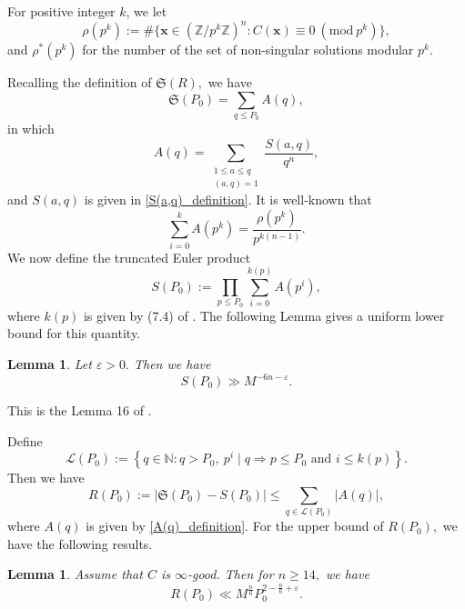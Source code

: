 \documentclass[12pt]{amsart}
\newtheorem{lemma}[theorem]{Lemma}
\theoremstyle{definition}
\numberwithin{equation}{section}
\begin{document}
For positive integer $k$, we let
\begin{equation*}
    \rho(p^k):= \# \{ \boldsymbol {x} \in (\mathbb{Z}/p^k\mathbb{Z})^{n} : C(\boldsymbol {x})\equiv 0\ (\text{mod} \ p^k)\},
\end{equation*}
and $\rho^{*}(p^k)$ for the number of the set of non-singular solutions modular $p^k.$

Recalling the definition of $\mathfrak{S}(R),$ we have
\begin{equation*}
    \mathfrak{S}(P_0)=\sum_{q \leq P_0} A(q),
\end{equation*}
in which
\begin{equation}
    \label{A(q)_definition}
    A(q) =\sum_{\substack{1 \leq a \leq q\\[3pt](a,q)=1}} \frac{S(a,q)}{q^n},
\end{equation}
and $S(a,q)$ is given in \eqref{S(a,q)_definition}. It is well-known that
\begin{equation*}
    \sum_{i=0}^{k}A(p^k)= \frac{\rho(p^k)}{p^{k(n-1)}}.
\end{equation*}
We now define the truncated Euler product
\begin{equation*}
    S(P_0) :=\prod_{p \leq P_0}\sum_{i=0}^{k(p)}A(p^i),
\end{equation*}
where $k(p)$ is given by (7.4) of \cite{browning2009least}. The following Lemma gives a uniform lower bound for this quantity.
\begin{lemma}
    Let $\varepsilon>0.$ Then we have
    \begin{equation*}
        S(P_0) \gg M^{-6n-\varepsilon}.
    \end{equation*}
\end{lemma}

This is the Lemma 16 of \cite{bernert2023}.

Define
\begin{equation*}
    \mathscr{L}(P_0):=\left\{q \in \mathbb{N}: q>P_0,\ p^i \mid q \Rightarrow p \leq P_0 \text{ and }i \leq k(p) \right\}.
\end{equation*}
Then we have
\begin{equation*}
    R(P_0) := |\mathfrak{S}(P_0)-S(P_0)| \leq \sum_{q \in \mathscr{L}(P_0)} |A(q)|,
\end{equation*}
where $A(q)$ is given by \eqref{A(q)_definition}. For the upper bound of $R(P_0),$ we have the following results.

\begin{lemma}
\label{lemma_4_2}
    Assume that $C$ is $\infty$-good. Then for $n \geq 14,$ we have
    \begin{equation*}
        R(P_0) \ll M^{\frac{n}{6}}P_0^{2-\frac{n}{6}+\varepsilon}.
    \end{equation*}
\end{lemma}
\end{document}
